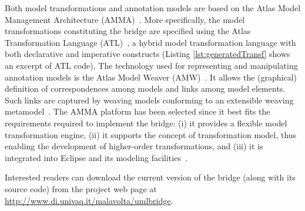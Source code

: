 Both model transformations and annotation models are based on the Atlas Model Management Architecture (AMMA)~\cite{1}.
More specifically, the model transformations constituting the bridge are specified using the
Atlas Transformation Language (ATL)~\cite{3}, a hybrid model transformation language with both declarative and imperative constructs (Listing \ref{lst:generatedTransf} shows an excerpt of ATL code).
The technology used for representing and manipulating annotation models is the Atlas Model Weaver (AMW)~\cite{3}. It allows the (graphical) definition of correspondences
among models and links among model elements. Such links are captured by weaving models conforming to an extensible weaving metamodel~\cite{MCDFthesis}. The AMMA platform has been selected since it best fits the requirements required to implement the bridge: (i) it provides a flexible model transformation engine, (ii) it supports the concept of transformation model, thus enabling the development of higher-order transformations, and (iii) it is integrated into Eclipse and its modeling facilities~\cite{bezivin_06_canonical}.

Interested readers can download the current version of the bridge (along with its source code) from the project
web page at \small{\url{http://www.di.univaq.it/malavolta/umlbridge}}.




